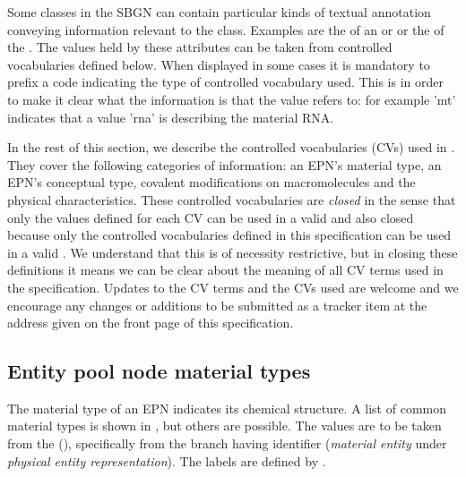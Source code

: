 
Some classes in the SBGN \PDl can contain particular kinds of textual
annotation conveying information relevant to the class.  Examples are
the  of an  or
 or the  of the
. The values held by these attributes can be
taken from controlled vocabularies defined below. When displayed in
some cases it is mandatory to prefix a code indicating the type of
controlled vocabulary used.  This is in order to make it clear what
the information is that the value refers to: for example 'mt'
indicates that a value 'rna' is describing the material RNA.

In the rest of this section, we describe the controlled vocabularies
(CVs) used in \SBGNPDLone.  They cover the following categories of
information: an EPN's material type, an EPN's conceptual type,
covalent modifications on macromolecules and the physical
characteristics. These controlled vocabularies are \emph{closed} in
the sense that only the values defined for each CV can be used in a
valid \PDm and also closed because only the controlled vocabularies
defined in this specification can be used in a valid \PDm{}. We
understand that this is of necessity restrictive, but in closing these
definitions it means we can be clear about the meaning of all CV terms
used in the specification. Updates to the CV terms and the CVs used
are welcome and we encourage any changes or additions to be submitted
as a tracker item at the address given on the front page of this
specification.


\subsection{Entity pool node material types}
\label{sec:techref:material-types-cv}

The material type of an EPN indicates its chemical structure.  A list
of common material types is shown in , but
others are possible.  The values are to be taken from the \sbo
(\sbourl), specifically from the branch having identifier
 ($\!$\emph{material entity} under \emph{physical entity representation}).
The labels are defined by \SBGNPDLone.

